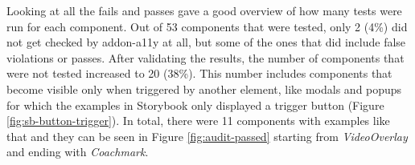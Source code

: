 \documentclass{master_thesis}
\begin{document}


Looking at all the fails and passes gave a good overview of how many tests were run for each component. Out of 53 components that were tested, only 2 (4\%) did not get checked by addon-a11y at all, but some of the ones that did include false violations or passes. After validating the results, the number of components that were not tested increased to 20 (38\%). This number includes components that become visible only when triggered by another element, like modals and popups for which the examples in Storybook only displayed a trigger button (Figure \ref{fig:sb-button-trigger}). In total, there were 11 components with examples like that and they can be seen in Figure \ref{fig:audit-passed} starting from \textit{VideoOverlay} and ending with \textit{Coachmark}.
\end{document}

